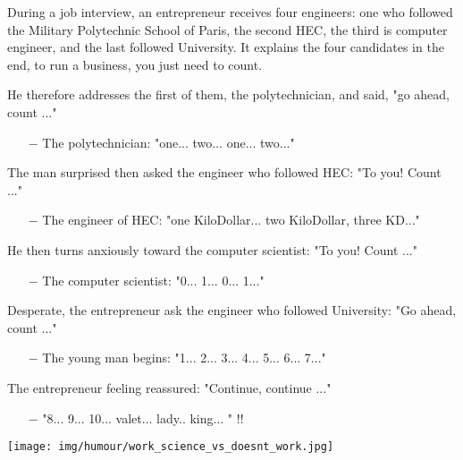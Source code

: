 \begin{center}\underline{\hspace{5 cm}}\end{center}

During a job interview, an entrepreneur receives four engineers: one who followed the Military Polytechnic School of Paris, the second HEC, the third is computer engineer, and the last followed University. It explains the four candidates in the end, to run a business, you just need to count.

He therefore addresses the first of them, the polytechnician, and said, "go ahead, count ..."

\begin{itemize}	 
	\item[$-$] The polytechnician: "one... two... one... two..."\end{itemize}


The man surprised then asked the engineer who followed HEC: "To you! Count ..."

\begin{itemize}	 
	\item[$-$] The engineer of HEC: "one KiloDollar... two KiloDollar, three KD..."\end{itemize} 


He then turns anxiously toward the computer scientist: "To you! Count ..."

\begin{itemize}	 
	\item[$-$] The computer scientist: "0... 1... 0... 1..." \end{itemize}

Desperate, the entrepreneur ask the engineer who followed University: "Go ahead, count ..."

\begin{itemize}	 
	\item[$-$] The young man begins: "1... 2... 3... 4... 5... 6... 7..." \end{itemize}

The entrepreneur feeling reassured: "Continue, continue ..."

\begin{itemize}	 
	\item[$-$] "8... 9... 10... valet... lady.. king... " !!\end{itemize}
	\begin{center}\underline{\hspace{5 cm}}\end{center}
	\begin{center}
		\texttt{[image: img/humour/work\_science\_vs\_doesnt\_work.jpg]}	
	\end{center}
	\pagebreak

